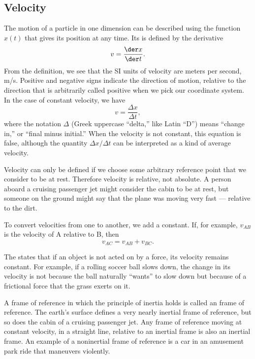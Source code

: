 \subsection{Velocity}
The motion of a particle in one dimension can be described using the
function $x(t)$ that gives its position at any time. Its  is
defined by the derivative
\begin{equation}
  v = \frac{\der x}{\der t}.
\end{equation}
From the definition, we see that the SI units of velocity are meters per second, m/s.
Positive and negative signs indicate the direction of motion, relative
to the direction that is arbitrarily called positive when we pick our
coordinate system. In the case of constant velocity, we have
\begin{equation}
  v = \frac{\Delta x}{\Delta t},
\end{equation}
where the notation $\Delta$ (Greek uppercase ``delta,'' like Latin ``D'') means ``change in,''
or ``final minus initial.'' When the velocity is not constant, this equation is false,
although the quantity $\Delta x/\Delta t$ can be interpreted as a kind of average velocity.

Velocity can only be defined if we choose some arbitrary reference point that we consider
to be at rest. Therefore velocity is relative, not absolute. A person aboard a cruising
passenger jet might consider the cabin to be at rest, but someone on the ground might
say that the plane was moving very fast --- relative to the dirt.

To convert velocities
from one  to another, we add a constant. If, for example, $v_{AB}$ is the velocity
of A relative to B, then
\begin{equation}
  v_{AC} = v_{AB}+v_{BC}.
\end{equation}

The 
states that if an object is not acted on by a force, its
velocity remains constant. For example, if a rolling soccer ball slows down, the change in
its velocity is not because the ball naturally ``wants'' to slow down but because of a frictional
force that the grass exerts on it.

A frame of reference in which the principle of inertia holds
is called an  frame of reference.
The earth's surface defines a very nearly inertial
frame of reference, but so does the cabin of a cruising passenger jet. Any frame of reference
moving at constant velocity, in a straight line, relative to an inertial frame is also an
inertial frame. An example of a noninertial frame of reference is a car in an amusement
park ride that maneuvers violently.

